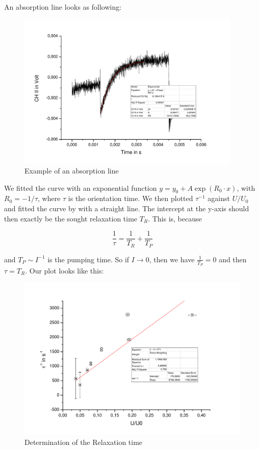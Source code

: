 An absorption line looks as following: 

\begin{figure}[H]
\centering \includegraphics[width=0.95\textwidth]{BilderAusw/DehmeltBsp.pdf}
\caption{Example of an absorption line}
\end{figure}

We fitted the curve with an exponential function $y=y_0 + A\exp(R_0\cdot x)$, with $R_0 = -1/\tau$, where $\tau$ is the orientation time. We then plotted $\tau^{-1}$ against $U/U_0$ and fitted the curve by with a straight line. The intercept at the y-axis should then exactly be the sought relaxation time $T_R$. This is, because

$$\frac{1}{\tau} = \frac{1}{T_R} + \frac{1}{T_P}$$

and $T_P \sim I^{-1}$ is the pumping time. So if $I \to 0$, then we have $\frac{1}{T_P} = 0$ and then $\tau = T_R$. Our plot looks like this:\\

\begin{figure}[H]
\centering \includegraphics[width=\textwidth]{BilderAusw/Dehmelt.pdf}
\caption{Determination of the Relaxation time}
\end{figure}

